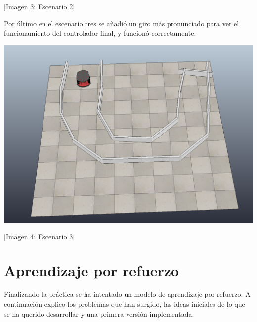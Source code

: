 \documentclass[14pt]{extarticle}
\theoremstyle{definition}
\theoremstyle{remark}
\begin{document}
\begin{center}
	[Imagen 3: Escenario 2]
\end{center}
Por último en el escenario tres se añadió un giro más pronunciado para ver el funcionamiento del controlador final, y funcionó correctamente.
\begin{center}
	\includegraphics[scale=0.4]{pioneer_corredor_dos.png}
\end{center}
\begin{center}
	[Imagen 4: Escenario 3]
\end{center}
\newpage
\section{Aprendizaje por refuerzo}\label{sec:aprendizajeporrefuerzo}
Finalizando la práctica se ha intentado un modelo de aprendizaje por refuerzo. A continuación explico los problemas que han surgido, las ideas iniciales de lo que se ha querido desarrollar y una primera versión implementada.
\end{document}
